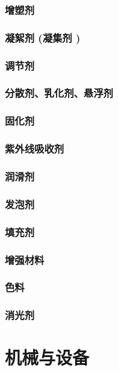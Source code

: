 \documentclass[UTF8]{../../ApplicationUniverse}
\begin{document}
                \subsubsection{增塑剂}
                \subsubsection{凝絮剂 (凝集剂 )}
                \subsubsection{调节剂}
                \subsubsection{分散剂、乳化剂、悬浮剂}
                \subsubsection{固化剂}
                \subsubsection{紫外线吸收剂}
                \subsubsection{润滑剂}
                \subsubsection{发泡剂}
                \subsubsection{填充剂}
                \subsubsection{增强材料}
                \subsubsection{色料}
                \subsubsection{消光剂}
\section{机械与设备}
\end{document}
